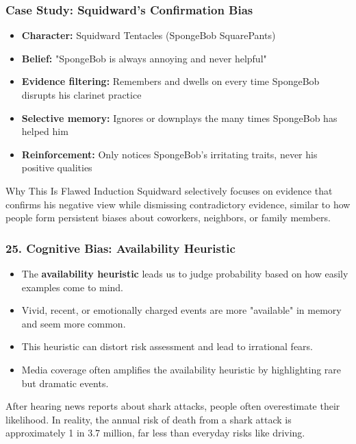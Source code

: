 \documentclass{beamer}
\begin{document}
\begin{frame}
    \frametitle{Case Study: Squidward's Confirmation Bias}
    
    \begin{itemize}
    \item \textbf{Character:} Squidward Tentacles (SpongeBob SquarePants)
    \item \textbf{Belief:} "SpongeBob is always annoying and never helpful"
    \item \textbf{Evidence filtering:} Remembers and dwells on every time SpongeBob disrupts his clarinet practice
    \item \textbf{Selective memory:} Ignores or downplays the many times SpongeBob has helped him
    \item \textbf{Reinforcement:} Only notices SpongeBob's irritating traits, never his positive qualities
    \end{itemize}
    
    \begin{alertblock}{Why This Is Flawed Induction}
    Squidward selectively focuses on evidence that confirms his negative view while dismissing contradictory evidence, similar to how people form persistent biases about coworkers, neighbors, or family members.
    \end{alertblock}
    \end{frame}

\begin{frame}
\frametitle{25. Cognitive Bias: Availability Heuristic}
\begin{itemize}
\item The \textbf{availability heuristic} leads us to judge probability based on how easily examples come to mind.
\item Vivid, recent, or emotionally charged events are more "available" in memory and seem more common.
\item This heuristic can distort risk assessment and lead to irrational fears.
\item Media coverage often amplifies the availability heuristic by highlighting rare but dramatic events.
\end{itemize}

\begin{example}
After hearing news reports about shark attacks, people often overestimate their likelihood. In reality, the annual risk of death from a shark attack is approximately 1 in 3.7 million, far less than everyday risks like driving.
\end{example}
\end{frame}
\end{document}
